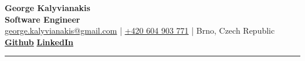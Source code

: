 \documentclass[]{deedy-resume-reversed}
\begin{document}
%
%
\begin{flushleft}
{\fontsize{24}{8}\selectfont \textbf{George Kalyvianakis}}\\
{\textcolor{subheading_gray}{\fontsize{16}{8}\selectfont \textbf{Software Engineer}}} \\
\vspace{6pt}
\href{mailto:george.kalyvianakis@gmail.com}{george.kalyvianakis@gmail.com} | \href{tel:+604903771}{+420 604 903 771} | Brno, Czech Republic \\
\vspace{3pt}
\href{https://github.com/CptGeo}{\bf Github} \textbullet{}
\href{https://www.linkedin.com/in/george-kalyvianakis/}{\bf LinkedIn} \\
\vspace{3pt}

\end{flushleft}

\hrule height 0.5pt
\vspace{3pt}

%
%
\end{document}
